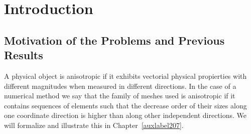 \chapter*{Introduction}
 
\section*{Motivation of the Problems and Previous Results} %

A physical object is anisotropic if it exhibits vectorial physical
propierties with different magnitudes when measured in different directions. In the case of
a numerical method we say that the family of meshes used is anisotropic if it 
contains sequences of elements such that the decrease order of their sizes along
one coordinate direction is higher than along other independent directions. 
We will formalize and 
illustrate this  in 
Chapter~\ref{auxlabel207}.

